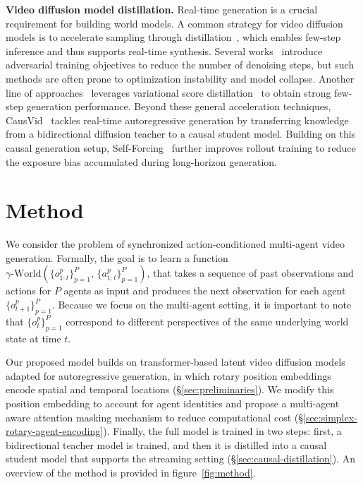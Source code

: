 \documentclass{llmxive}
\begin{document}
\noindent\textbf{Video diffusion model distillation.}
Real-time generation is a crucial requirement for building world models.
A common strategy for video diffusion models is to accelerate sampling through distillation~\cite{salimans2022progressive, geng2025mean, frans2024one}, which enables few-step inference and thus supports real-time synthesis.
Several works~\cite{sauer2024fast, sauer2024adversarial, kang2024distilling, lin2025diffusion, lin2024sdxl, lin2025autoregressive} introduce adversarial training objectives to reduce the number of denoising steps, but such methods are often prone to optimization instability and model collapse.
Another line of approaches~\cite{yin2024one, yin2024improved, lu2025adversarial} leverages variational score distillation~\cite{wang2023prolificdreamer} to obtain strong few-step generation performance.
Beyond these general acceleration techniques, CausVid~\cite{yin2025slow} tackles real-time autoregressive generation by transferring knowledge from a bidirectional diffusion teacher to a causal student model.
Building on this causal generation setup, Self-Forcing~\cite{huang2025self} further improves rollout training to reduce the exposure bias accumulated during long-horizon generation.

\section{Method}

We consider the problem of synchronized action-conditioned multi-agent video generation. Formally, the goal is to learn a function $\gamma\text{-World}(\{o_{1:t}^p\}_{p=1}^P,\, \{a_{1:t}^p\}_{p=1}^P)$, that takes a sequence of past observations and actions for $P$ agents as input and produces the next observation for each agent $\{o_{t+1}^p\}_{p=1}^P$. Because we focus on the multi-agent setting, it is important to note that $\{o_t^p\}_{p=1}^P$ correspond to different perspectives of the same underlying world state at time $t$.

Our proposed model builds on transformer-based latent video diffusion models adapted for autoregressive generation, in which rotary position embeddings encode spatial and temporal locations (\S\ref{sec:preliminaries}). We modify this position embedding to account for agent identities and propose a multi-agent aware attention masking mechanism to reduce computational cost (\S\ref{sec:simplex-rotary-agent-encoding}). Finally, the full model is trained in two steps: first, a bidirectional teacher model is trained, and then it is distilled into a causal student model that supports the streaming setting (\S\ref{sec:causal-distillation}). An overview of the method is provided in figure~\ref{fig:method}.
\end{document}
